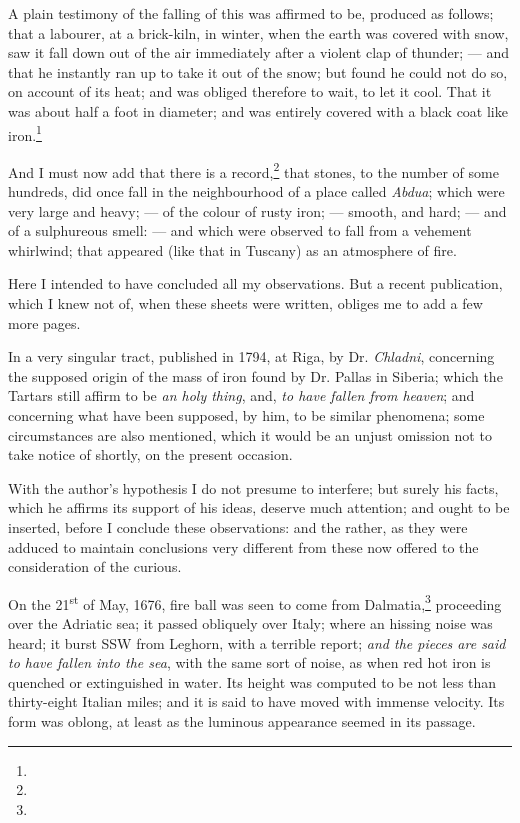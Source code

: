 \documentclass[a4paper, 12pt, oneside, twocolumn]{article}
\begin{document}
A plain testimony of the falling of this was affirmed to be, produced as follows; that a labourer, at a brick-kiln, in winter, when the earth was covered with snow, saw it fall down out of the air immediately after a violent clap of thunder; --- and that he instantly ran up to take it out of the snow; but found he could not do so, on account of its heat; and was obliged therefore to wait, to let it cool. That it was about half a foot in diameter; and was entirely covered with a black coat like iron.\footnote{}

And I must now add that there is a record,\footnote{} that stones, to the number of some hundreds, did once fall in the neighbourhood of a place called \emph{Abdua}; which were very large and heavy; --- of the colour of rusty iron; --- smooth, and hard; --- and of a sulphureous smell: --- and which were observed to fall from a vehement whirlwind; that appeared (like that in Tuscany) as an atmosphere of fire.

Here I intended to have concluded all my observations. But a recent publication, which I knew not of, when these sheets were written, obliges me to add a few more pages.

In a very singular tract, published in 1794, at Riga, by Dr. \emph{Chladni}, concerning the supposed origin of the mass of iron found by Dr. Pallas in Siberia; which the Tartars still affirm to be \emph{an holy thing}, and, \emph{to have fallen from heaven}; and concerning what have been supposed, by him, to be similar phenomena; some circumstances are also mentioned, which it would be an unjust omission not to take notice of shortly, on the present occasion.

With the author's hypothesis I do not presume to interfere; but surely his facts, which he affirms its support of his ideas, deserve much attention; and ought to be inserted, before I conclude these observations: and the rather, as they were adduced to maintain conclusions very different from these now offered to the consideration of the curious.

On the 21\textsuperscript{st} of May, 1676, fire ball was seen to come from Dalmatia,\footnote{} proceeding over the Adriatic sea; it passed obliquely over Italy; where an hissing noise was heard; it burst SSW from Leghorn, with a terrible report; \emph{and the pieces are said to have fallen into the sea}, with the same sort of noise, as when red hot iron is quenched or extinguished in water. Its height was computed to be not less than thirty-eight Italian miles; and it is said to have moved with immense velocity. Its form was oblong, at least as the luminous appearance seemed in its passage.
\end{document}
